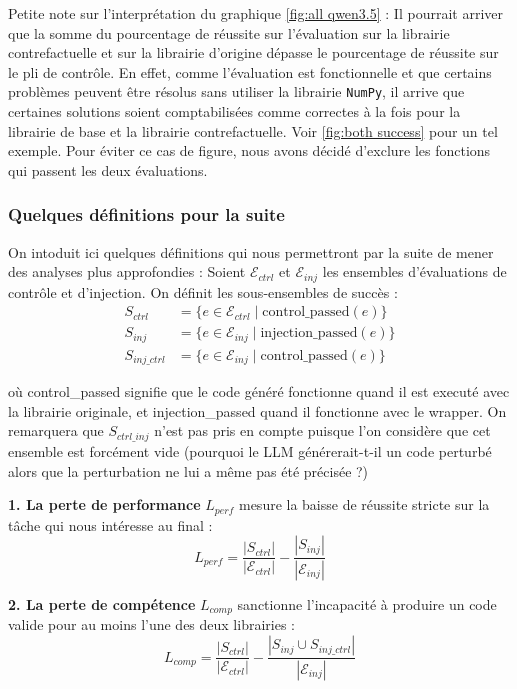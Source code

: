\documentclass[11pt, a4paper]{article}
\begin{document}
Petite note sur l'interprétation du graphique \ref{fig:all qwen3.5} : Il pourrait arriver que la somme du pourcentage de réussite sur l'évaluation sur la librairie contrefactuelle et sur la librairie d'origine dépasse le pourcentage de réussite sur le pli de contrôle. En effet, comme l'évaluation est fonctionnelle et que certains problèmes peuvent être résolus sans utiliser la librairie \texttt{NumPy}, il arrive que certaines solutions soient comptabilisées comme correctes à la fois pour la librairie de base et la librairie contrefactuelle. Voir \ref{fig:both success} pour un tel exemple. Pour éviter ce cas de figure, nous avons décidé d'exclure les fonctions qui passent les deux évaluations.




\subsubsection{Quelques définitions pour la suite}
On intoduit ici quelques définitions qui nous permettront par la suite de mener des analyses plus approfondies :
Soient $\mathcal{E}_{ctrl}$ et $\mathcal{E}_{inj}$ les ensembles d'évaluations de contrôle et d'injection. On définit les sous-ensembles de succès :
\begin{align*}
    S_{ctrl} &= \{ e \in \mathcal{E}_{ctrl} \mid \text{control\_passed}(e) \} \\
    S_{inj} &= \{ e \in \mathcal{E}_{inj} \mid \text{injection\_passed}(e) \} \\
    S_{inj\_ctrl} &= \{ e \in \mathcal{E}_{inj} \mid \text{control\_passed}(e) \}
\end{align*}

où control\_passed signifie que le code généré fonctionne quand il est executé avec la librairie originale, et injection\_passed quand il fonctionne avec le wrapper. On remarquera que $S_{ctrl\_inj}$ n'est pas pris en compte puisque l'on considère que cet ensemble est forcément vide (pourquoi le LLM générerait-t-il un code perturbé alors que la perturbation ne lui a même pas été précisée ?)

\textbf{1. La perte de performance} $L_{perf}$ mesure la baisse de réussite stricte sur la tâche qui nous intéresse au final :
\begin{equation}
    L_{perf} = \frac{|S_{ctrl}|}{|\mathcal{E}_{ctrl}|} - \frac{|S_{inj}|}{|\mathcal{E}_{inj}|}
\end{equation}

\textbf{2. La perte de compétence} $L_{comp}$ sanctionne l'incapacité à produire un code valide pour au moins l'une des deux librairies :
\begin{equation}
    L_{comp} = \frac{|S_{ctrl}|}{|\mathcal{E}_{ctrl}|} - \frac{|S_{inj} \cup S_{inj\_ctrl}|}{|\mathcal{E}_{inj}|}
\end{equation}
\end{document}
